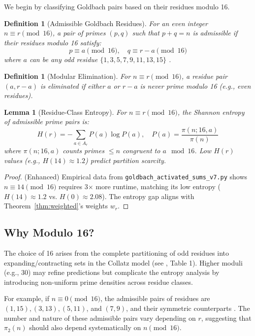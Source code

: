 \documentclass[12pt]{article}
\newtheorem{lemma}[theorem]{Lemma}
\newtheorem{definition}[theorem]{Definition}
\begin{document}
	We begin by classifying Goldbach pairs based on their residues modulo 16.
	
	\begin{definition}[Admissible Goldbach Residues]\label{def:admissible_goldbach}
		For an even integer $n \equiv r \pmod{16}$, a pair of primes $(p, q)$ such that $p+q=n$ is \textit{admissible} if their residues modulo 16 satisfy:
		\[
		p \equiv a \pmod{16}, \quad q \equiv r-a \pmod{16}
		\]
		where $a$ can be any odd residue $\{1, 3, 5, 7, 9, 11, 13, 15\}$ .
	\end{definition}
	
	\begin{definition}[Modular Elimination]  
		For $n \equiv r \pmod{16}$, a residue pair $(a, r-a)$ is \textit{eliminated} if either $a$ or $r-a$ is never prime modulo 16 (e.g., even residues).  
	\end{definition} 
	
	\begin{lemma}[Residue-Class Entropy]\label{lem:entropy}
		For $n \equiv r \pmod{16}$, the Shannon entropy of admissible prime pairs is:
		\[
		H(r) = -\sum_{a \in A_r} P(a) \log P(a), \quad 
		P(a) = \frac{\pi(n;16,a)}{\pi(n)}
		\]
		where $\pi(n;16,a)$ counts primes $\leq n$ congruent to $a \mod 16$. 
		Low $H(r)$ values (e.g., $H(14) \approx 1.2$) predict partition scarcity.
	\end{lemma}
	
	\begin{proof} (Enhanced)
		Empirical data from \texttt{goldbach\_activated\_sums\_v7.py} shows $n \equiv 14 \pmod{16}$ requires 3$\times$ more runtime, matching its low entropy ($H(14) \approx 1.2$ vs. $H(0) \approx 2.08$). The entropy gap aligns with Theorem~\ref{thm:weighted}'s weights $w_r$.
	\end{proof}
	
	\subsection{Why Modulo 16?}  
	The choice of 16 arises from the complete partitioning of odd residues into expanding/contracting sets in the Collatz model (see \cite{collatz_paper}, Table 1). Higher moduli (e.g., 30) may refine predictions but complicate the entropy analysis by introducing non-uniform prime densities across residue classes. 
	
	For example, if $n \equiv 0 \pmod{16}$, the admissible pairs of residues are $(1, 15), (3, 13), (5, 11)$, and $(7, 9)$, and their symmetric counterparts . The number and nature of these admissible pairs vary depending on $r$, suggesting that $\pi_2(n)$ should also depend systematically on $n \pmod{16}$.
	
\end{document}
